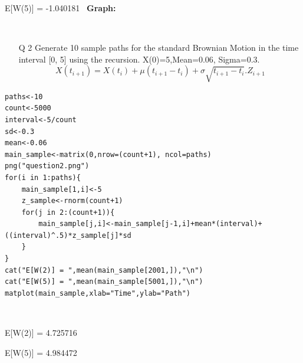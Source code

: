 \documentclass[11pt]{article}
\begin{document}
E[W(5)] =  -1.040181\
\newpage
\textbf{Graph: }\
\begin{figure}[H]
\centering
{}\\
\end{figure}
\newpage
\begin{enumerate}
\item[Q 2] Generate 10 sample paths for the standard Brownian Motion in the time interval [0, 5]
using the recursion. X(0)=5,Mean=0.06, Sigma=0.3.
\[X(t_{i+1}) = X(t_i)+\mu(t_{i+1}-t_{i})+\sigma\sqrt{t_{i+1}-t_i}.Z_{i+1}\]
\end{enumerate}
\noindent{Code: R}
\begin{lstlisting}
paths<-10
count<-5000
interval<-5/count
sd<-0.3
mean<-0.06
main_sample<-matrix(0,nrow=(count+1), ncol=paths)
png("question2.png")
for(i in 1:paths){
	main_sample[1,i]<-5
	z_sample<-rnorm(count+1)
	for(j in 2:(count+1)){
		main_sample[j,i]<-main_sample[j-1,i]+mean*(interval)+((interval)^.5)*z_sample[j]*sd
	}
}
cat("E[W(2)] = ",mean(main_sample[2001,]),"\n")
cat("E[W(5)] = ",mean(main_sample[5001,]),"\n")
matplot(main_sample,xlab="Time",ylab="Path")
\end{lstlisting}
\

E[W(2)] =  4.725716\

E[W(5)] =  4.984472\
\end{document}
